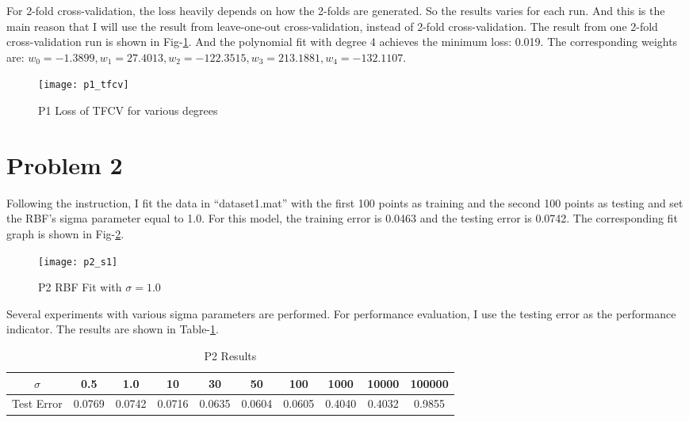 \documentclass[12pt]{article}
\begin{document}
For 2-fold cross-validation, the loss heavily depends on how the 2-folds are generated. So the results varies for each run. And this is the main reason that I will use the result from leave-one-out cross-validation, instead of 2-fold cross-validation. The result from one 2-fold cross-validation run is shown in Fig-\ref{fig:p1_tfcv}. And the polynomial fit with degree 4 achieves the minimum loss: 0.019. The corresponding weights are: $w_0 = -1.3899, w_1 = 27.4013, w_2 = -122.3515, w_3 = 213.1881, w_4 = -132.1107$.

\begin{figure}[ht!]
  \centering
  \texttt{[image: p1\_tfcv]}
  \caption{P1 Loss of TFCV for various degrees \label{fig:p1_tfcv}}
\end{figure}

\section{Problem 2}

Following the instruction, I fit the data in ``dataset1.mat'' with the first 100 points as training and the second 100 points as testing and set the RBF's sigma parameter equal to 1.0. For this model, the training error is 0.0463 and the testing error is 0.0742. The corresponding fit graph is shown in Fig-\ref{fig:p2_s1}.

\begin{figure}[ht!]
  \centering
  \texttt{[image: p2\_s1]}
  \caption{P2 RBF Fit with $\sigma = 1.0$ \label{fig:p2_s1}}
\end{figure}

Several experiments with various sigma parameters are performed. For performance evaluation, I use the testing error as the performance indicator. The results are shown in Table-\ref{tab:p2_exp}.

\begin{table}[ht!]
  \begin{center}
    \begin{tabular}{|c|c|c|c|c|c|c|c|c|c|}
      \hline
      $\sigma$	  &   0.5  &  1.0   &  10    &  30    &  50   
      	          &   100  &  1000  & 10000  & 100000 \\ \hline
      Test Error  & 0.0769 & 0.0742 & 0.0716 & 0.0635 & 0.0604
      		  & 0.0605 & 0.4040 & 0.4032 & 0.9855 \\ \hline
    \end{tabular}
  \end{center}
  \caption{P2 Results\label{tab:p2_exp}}
\end{table}
\end{document}
